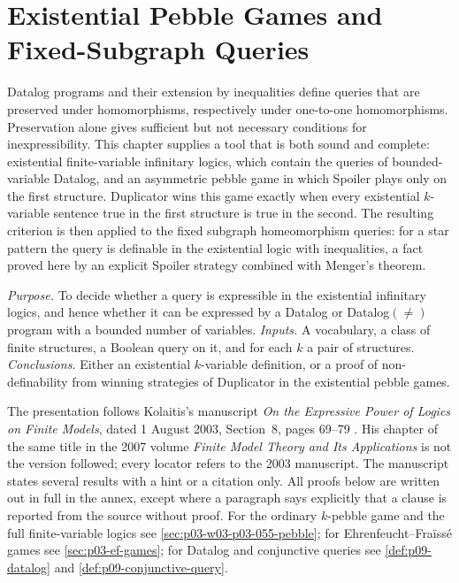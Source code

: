 \chapter{Existential Pebble Games and Fixed-Subgraph Queries}
\label{sec:p03-w03-p03-061-existential}

Datalog programs and their extension by inequalities define queries that are
preserved under homomorphisms, respectively under one-to-one homomorphisms.
Preservation alone gives sufficient but not necessary conditions for
inexpressibility. This chapter supplies a tool that is both sound and
complete: existential finite-variable infinitary logics, which contain the
queries of bounded-variable Datalog, and an asymmetric pebble game in which
Spoiler plays only on the first structure. Duplicator wins this game exactly
when every existential \(k\)-variable sentence true in the first structure is
true in the second. The resulting criterion is then applied to the fixed
subgraph homeomorphism queries: for a star pattern the query is definable in
the existential logic with inequalities, a fact proved here by an explicit
Spoiler strategy combined with Menger's theorem.

\emph{Purpose.} To decide whether a query is expressible in the existential
infinitary logics, and hence whether it can be expressed by a Datalog or
Datalog\((\neq)\) program with a bounded number of variables.
\emph{Inputs.} A vocabulary, a class of finite structures, a Boolean query on
it, and for each \(k\) a pair of structures. \emph{Conclusions.} Either an
existential \(k\)-variable definition, or a proof of non-definability from
winning strategies of Duplicator in the existential pebble games.

The presentation follows Kolaitis's manuscript \emph{On the Expressive Power
of Logics on Finite Models}, dated 1 August 2003, Section~8, pages 69--79
\cite[Sect.~8, pp.~69--79]{Kolaitis2003ExpressivePowerNotes}. His chapter of
the same title in the 2007 volume \emph{Finite Model Theory and Its
Applications} is not the version followed; every locator refers to the 2003
manuscript. The manuscript states several results with a hint or a citation
only. All proofs below are written out in full in the annex, except where a
paragraph says explicitly that a clause is reported from the source without
proof. For the ordinary \(k\)-pebble game and the full finite-variable logics
see \cref{sec:p03-w03-p03-055-pebble}; for Ehrenfeucht--Fra\"iss\'e games see
\cref{sec:p03-ef-games}; for Datalog and conjunctive queries see
\cref{def:p09-datalog} and \cref{def:p09-conjunctive-query}.


